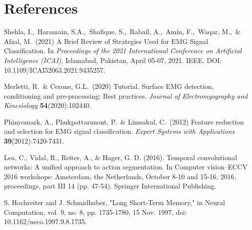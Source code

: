 
\section*{References}




{
\small
\begin{enumerate}[label={[}\arabic*{]}]
    \item Shehla, I.,\  Haramain, S.A.,\ Shafique, S.,\  Rabail, A.,\  Amin, F.,\  Waqar, M.,\  \& Afzal, M.\ (2021) 
    A Brief Review of Strategies Used for EMG Signal Classification.  
    In \textit{Proceedings of the 2021 International Conference on Artificial Intelligence (ICAI)},  
    Islamabad, Pakistan, April 05-07, 2021. IEEE.  
    DOI: 10.1109/ICAI52063.2021.9435257.  


    \item Merletti, R.\ \& Cerone, G.L.\
    (2020) Tutorial. Surface EMG detection, conditioning and pre-processing: Best 
    practices.
    {\it Journal of Electromyography and Kinesiology} {\bf 54}(2020):102440.


    \item Phinyomark, A., Phukpattaranont, P.\ \& Limsakul, C.\
    (2012) Feature reduction and selection for EMG signal classification.
    {\it Expert Systems with Applications} {\bf 39}(2012):7420-7431.
    
    \item Lea, C., Vidal, R., Reiter, A., \& Hager, G. D. (2016). Temporal convolutional networks: A unified approach to action segmentation. In Computer vision–ECCV 2016 workshops: Amsterdam, the Netherlands, October 8-10 and 15-16, 2016, proceedings, part III 14 (pp. 47-54). Springer International Publishing.

    \item S. Hochreiter and J. Schmidhuber, "Long Short-Term Memory," in Neural Computation, vol. 9, no. 8, pp. 1735-1780, 15 Nov. 1997, doi: 10.1162/neco.1997.9.8.1735.
\end{enumerate}
}